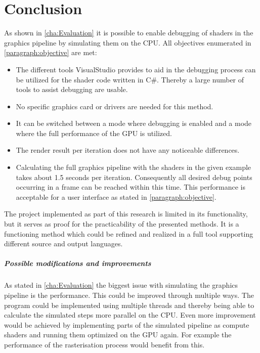 
\chapter{Conclusion}\label{cha:Conclusion}

As shown in \autoref{cha:Evaluation} it is possible to enable debugging of shaders in the graphics pipeline by simulating them on the CPU. All objectives enumerated in \autoref{paragraph:objective} are met:

\begin{itemize}
\item The different tools VisualStudio provides to aid in the debugging process can be utilized for the shader code written in C\#. Thereby a large number of tools to assist debugging are usable.
\item No specific graphics card or drivers are needed for this method. 
\item It can be switched between a mode where debugging is enabled and a mode where the full performance of the GPU is utilized.
\item The render result per iteration does not have any noticeable differences.
\item Calculating the full graphics pipeline with the shaders in the given example takes about 1.5 seconds per iteration. Consequently all desired debug points occurring in a frame can be reached within this time. This performance is acceptable for a user interface as stated in \autoref{paragraph:objective}.
\end{itemize}

The project implemented as part of this research is limited in its functionality, but it serves as proof for the practicability of the presented methods. It is a functioning method which could be refined and realized in a full tool supporting different source and output languages.

\paragraph{Possible modifications and improvements}

As stated in \autoref{cha:Evaluation} the biggest issue with simulating the graphics pipeline is the performance. This could be improved through multiple ways. The program could be implemented using multiple threads and thereby being able to calculate the simulated steps more parallel on the CPU. Even more improvement would be achieved by implementing parts of the simulated pipeline as compute shaders and running them optimized on the GPU again. For example the performance of the rasterisation process would benefit from this.

